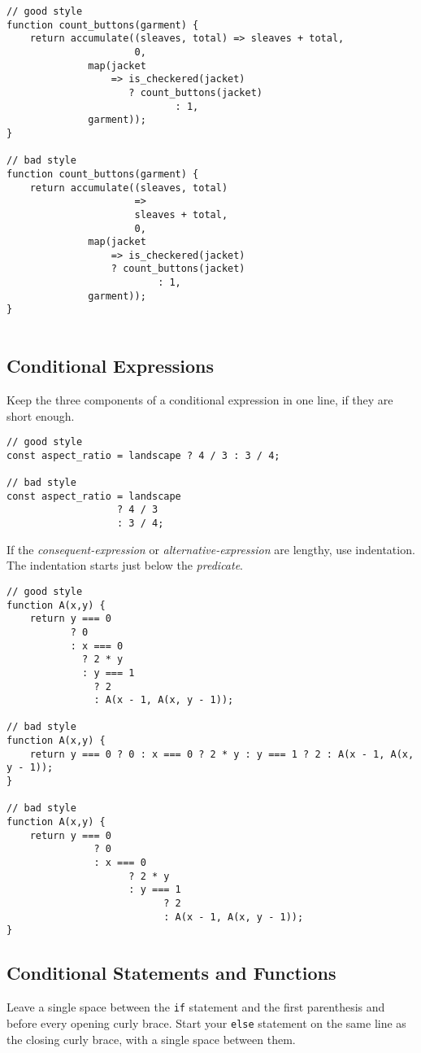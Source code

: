 \begin{lstlisting}
// good style
function count_buttons(garment) {
    return accumulate((sleaves, total) => sleaves + total,
                      0, 
		      map(jacket
		          => is_checkered(jacket)
		             ? count_buttons(jacket)
                             : 1,
			  garment));
}

// bad style
function count_buttons(garment) {
    return accumulate((sleaves, total)
                      =>
                      sleaves + total,
                      0, 
		      map(jacket
		          => is_checkered(jacket)
		          ? count_buttons(jacket)
                          : 1,
			  garment));
}


\end{lstlisting}


  \subsection*{Conditional Expressions}
\label{condex}
Keep the three components of a conditional expression in one line, if they are short enough.

\begin{lstlisting}
// good style
const aspect_ratio = landscape ? 4 / 3 : 3 / 4;

// bad style
const aspect_ratio = landscape
                   ? 4 / 3
                   : 3 / 4;
\end{lstlisting}

If the \textit{consequent-expression} or \textit{alternative-expression} are lengthy, use
indentation. The indentation starts just below the \textit{predicate}.

\begin{lstlisting}
// good style
function A(x,y) {
    return y === 0
           ? 0
           : x === 0
             ? 2 * y
             : y === 1
               ? 2
               : A(x - 1, A(x, y - 1));

// bad style
function A(x,y) {
    return y === 0 ? 0 : x === 0 ? 2 * y : y === 1 ? 2 : A(x - 1, A(x, y - 1));
}

// bad style
function A(x,y) {
    return y === 0
               ? 0
               : x === 0
                     ? 2 * y
                     : y === 1
                           ? 2
                           : A(x - 1, A(x, y - 1));
}
\end{lstlisting}

  \subsection*{Conditional Statements and Functions}
  Leave a single space between the \lstinline{if} statement and the first parenthesis and before every opening curly brace.
  Start your \lstinline{else} statement on the same line as the closing curly brace, with a single space between them.


